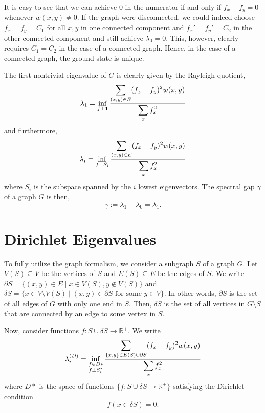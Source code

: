   It is easy to see that we can achieve 0 in the numerator if and only if $f_x - f_y = 0$ whenever $w(x,y)\neq 0$. If the graph were disconnected, we could indeed choose $f_x = f_y = C_1$ for all $x,y$ in one connected component and $f_x' = f_y' = C_2$ in the other connected component and still achieve $\lambda_0 = 0$. This, however, clearly requires $C_1 = C_2$ in the case of a connected graph. Hence, in the case of a connected graph, the ground-state is unique.
  
  The first nontrivial eigenvalue of $G$ is clearly given by the Rayleigh quotient,
  \begin{equation*}
      \lambda_1 = \inf_{f \perp \mathbf{1}} \frac{\displaystyle \sum_{(x,y) \in E}(f_x - f_y)^2 w(x,y)}{\displaystyle \sum_{x} f_x^2}
  \end{equation*}
  and furthermore,
  \begin{equation}\label{eqn:graph-eigenvalues}
      \lambda_i = \inf_{f \perp S_{i}} \frac{\displaystyle \sum_{(x,y) \in E}(f_x - f_y)^2 w(x,y)}{\displaystyle \sum_{x} f_x^2}
  \end{equation}
  where $S_i$ is the subspace spanned by the $i$ lowest eigenvectors. The spectral gap $\gamma$ of a graph $G$ is then,
  \[
      \gamma := \lambda_1 - \lambda_0 = \lambda_1.
  \]
  

\section{Dirichlet Eigenvalues}\label{sec:dirichlet_1}
  To fully utilize the graph formalism, we consider a subgraph $S$ of a graph $G$. Let $V(S) \subseteq V$ be the vertices of $S$ and $E(S) \subseteq E$ be the edges of $S$. We write $\partial S = \{ (x,y) \in E \; \vert \; x \in V(S), y \notin V(S) \}$ and $\delta S = \{ x \in V \setminus V(S) \; \vert \; (x,y) \in \partial S \text{ for some } y \in V \}$. In other words, $\partial S$ is the set of all edges of $G$ with only one end in $S$. Then, $\delta S$ is the set of all vertices in $G \setminus S$ that are connected by an edge to some vertex in $S$.
  
  Now, consider functions $f: S \cup \delta S \rightarrow \mathbb{R}^{+}$. We write 
  \begin{equation}\label{eqn:dirichlet-eigenvalues}
    \lambda_i^{(D)} = \inf_{\substack{f\in D* \\ f \perp S_{i}^*}} \frac{\displaystyle \sum_{\{x,y\} \in E(S)\cup \partial S}(f_x - f_y)^2 w(x,y)}{\displaystyle \sum_{x} f_x^2}
  \end{equation}
  where $D*$ is the space of functions $\{f: S \cup \delta S \rightarrow \mathbb{R}^{+} \}$ satisfying the Dirichlet condition
  \[
    f(x \in \delta S) = 0.
  \]
  
